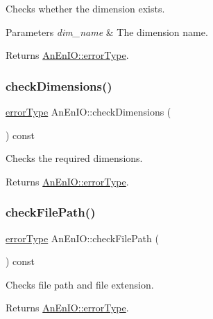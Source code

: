 Checks whether the dimension exists.


\begin{DoxyParams}{Parameters}
{\em dim\+\_\+name} & The dimension name. \\
\hline
\end{DoxyParams}
\begin{DoxyReturn}{Returns}
\mbox{\hyperlink{class_an_en_i_o_aa56bc1ec6610b86db4349bce20f9ead0}{An\+En\+I\+O\+::error\+Type}}. 
\end{DoxyReturn}
\mbox{\label{class_an_en_i_o_ab6cd06f6402655924002fec4f83195eb}} 
\subsubsection{\texorpdfstring{check\+Dimensions()}{checkDimensions()}}
{\footnotesize\ttfamily \mbox{\hyperlink{class_an_en_i_o_aa56bc1ec6610b86db4349bce20f9ead0}{error\+Type}} An\+En\+I\+O\+::check\+Dimensions (\begin{DoxyParamCaption}{ }\end{DoxyParamCaption}) const}

Checks the required dimensions. \begin{DoxyReturn}{Returns}
\mbox{\hyperlink{class_an_en_i_o_aa56bc1ec6610b86db4349bce20f9ead0}{An\+En\+I\+O\+::error\+Type}}. 
\end{DoxyReturn}
\mbox{\label{class_an_en_i_o_aac9e5ef017cb141eedbbda6583b699ad}} 
\subsubsection{\texorpdfstring{check\+File\+Path()}{checkFilePath()}}
{\footnotesize\ttfamily \mbox{\hyperlink{class_an_en_i_o_aa56bc1ec6610b86db4349bce20f9ead0}{error\+Type}} An\+En\+I\+O\+::check\+File\+Path (\begin{DoxyParamCaption}{ }\end{DoxyParamCaption}) const}

Checks file path and file extension.

\begin{DoxyReturn}{Returns}
\mbox{\hyperlink{class_an_en_i_o_aa56bc1ec6610b86db4349bce20f9ead0}{An\+En\+I\+O\+::error\+Type}}. 
\end{DoxyReturn}
\mbox{\label{class_an_en_i_o_aa9b4700db58d0ef09af429d5d31ff55f}} 
